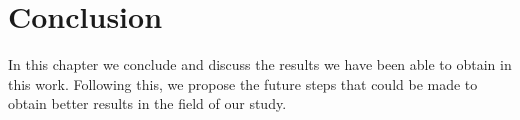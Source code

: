 \chapter*{Conclusion}  %

In this chapter we conclude and discuss the results we have been able to
obtain in this work. Following this, we propose the future steps that could
be made to obtain better results in the field of our study.





